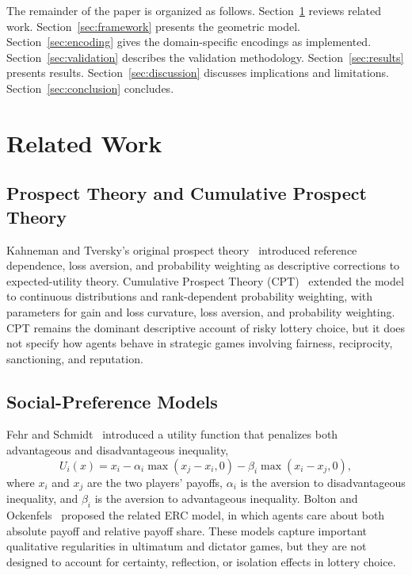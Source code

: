 \documentclass[journal]{IEEEtran}
\begin{document}
The remainder of the paper is organized as follows.
Section~\ref{sec:related} reviews related work.
Section~\ref{sec:framework} presents the geometric model.
Section~\ref{sec:encoding} gives the domain-specific encodings as implemented.
Section~\ref{sec:validation} describes the validation methodology.
Section~\ref{sec:results} presents results.
Section~\ref{sec:discussion} discusses implications and limitations.
Section~\ref{sec:conclusion} concludes.
\section{Related Work}
\label{sec:related}

\subsection{Prospect Theory and Cumulative Prospect Theory}

Kahneman and Tversky's original prospect theory~\cite{kahneman1979} introduced reference dependence, loss aversion, and probability weighting as descriptive corrections to expected-utility theory.
Cumulative Prospect Theory (CPT)~\cite{tversky1992} extended the model to continuous distributions and rank-dependent probability weighting, with parameters for gain and loss curvature, loss aversion, and probability weighting.
CPT remains the dominant descriptive account of risky lottery choice, but it does not specify how agents behave in strategic games involving fairness, reciprocity, sanctioning, and reputation.

\subsection{Social-Preference Models}

Fehr and Schmidt~\cite{fehr1999} introduced a utility function that penalizes both advantageous and disadvantageous inequality,
\begin{equation}
    U_i(x) = x_i - \alpha_i \max(x_j - x_i, 0) - \beta_i \max(x_i - x_j, 0),
    \label{eq:fehr_schmidt}
\end{equation}
where $x_i$ and $x_j$ are the two players' payoffs, $\alpha_i$ is the aversion to disadvantageous inequality, and $\beta_i$ is the aversion to advantageous inequality.
Bolton and Ockenfels~\cite{bolton2000} proposed the related ERC model, in which agents care about both absolute payoff and relative payoff share.
These models capture important qualitative regularities in ultimatum and dictator games, but they are not designed to account for certainty, reflection, or isolation effects in lottery choice.
\end{document}
